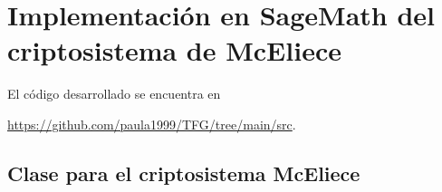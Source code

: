 \chapter[Implementación en SageMath del criptosistema de McEliece]{Implementación en SageMath del criptosistema de McEliece}
\label{annex:sage-McEliece}


El código desarrollado se encuentra en
\begin{center}
    \url{https://github.com/paula1999/TFG/tree/main/src}.
\end{center}

\section{Clase para el criptosistema McEliece}

